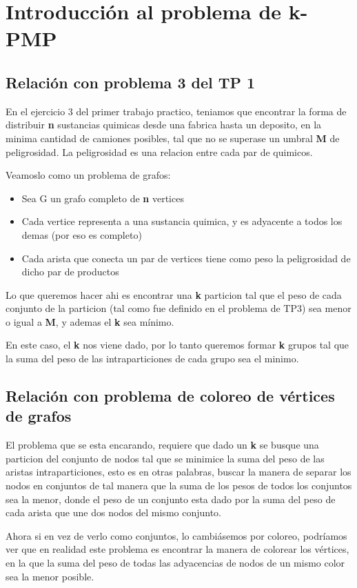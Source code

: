\documentclass[10pt,a4paper]{article}
\begin{document}
\section{Introducción al problema de k-PMP}
\subsection{Relación con problema 3 del TP 1}
En el ejercicio 3 del primer trabajo practico, teniamos que encontrar la forma de distribuir \textbf{n} sustancias quimicas desde una fabrica hasta un deposito, en la minima cantidad de camiones posibles, tal que no se superase un umbral \textbf{M} de peligrosidad. La peligrosidad es una relacion entre cada par de quimicos.

Veamoslo como un problema de grafos:

\begin{itemize}
 \item Sea G un grafo completo de \textbf{n} vertices
 \item Cada vertice representa a una sustancia quimica, y es adyacente a todos los demas (por eso es completo)
 \item Cada arista que conecta un par de vertices tiene como peso la peligrosidad de dicho par de productos
\end{itemize}

Lo que queremos hacer ahi es encontrar una \textbf{k} particion tal que el peso de cada conjunto de la particion (tal como fue definido en el problema de TP3) sea menor o igual a \textbf{M}, y ademas el \textbf{k} sea mínimo.

En este caso, el \textbf{k} nos viene dado, por lo tanto queremos formar \textbf{k} grupos tal que la suma del peso de las intraparticiones de cada grupo sea el minimo.

\subsection{Relación con problema de coloreo de vértices de grafos}
El problema que se esta encarando, requiere que dado un \textbf{k} se busque una particion del conjunto de nodos tal que se minimice la suma del peso de las aristas intraparticiones, esto es en otras palabras, buscar la manera de separar los nodos en conjuntos de tal manera que la suma de los pesos de todos los conjuntos sea la menor, donde el peso de un conjunto esta dado por la suma del peso de cada arista que une dos nodos del mismo conjunto.

Ahora si en vez de verlo como conjuntos, lo cambiásemos por coloreo, podríamos ver que en realidad este problema es encontrar la manera de colorear los vértices, en la que la suma del peso de todas las adyacencias de nodos de un mismo color sea la menor posible.
\end{document}
